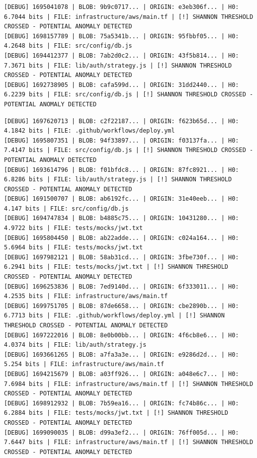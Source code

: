 \documentclass[12pt, a4paper, oneside]{report}
\begin{document}
\begin{lstlisting}[basicstyle=\tiny\ttfamily]
[DEBUG] 1695041078 | BLOB: 9b9c0717... | ORIGIN: e3eb306f... | H0: 6.7044 bits | FILE: infrastructure/aws/main.tf | [!] SHANNON THRESHOLD CROSSED - POTENTIAL ANOMALY DETECTED
[DEBUG] 1698157789 | BLOB: 75a5341b... | ORIGIN: 95fbbf05... | H0: 4.2648 bits | FILE: src/config/db.js
[DEBUG] 1694412377 | BLOB: 7ab2d0c2... | ORIGIN: 43f5b814... | H0: 7.3671 bits | FILE: lib/auth/strategy.js | [!] SHANNON THRESHOLD CROSSED - POTENTIAL ANOMALY DETECTED
[DEBUG] 1692738905 | BLOB: cafa599d... | ORIGIN: 31dd2440... | H0: 6.2239 bits | FILE: src/config/db.js | [!] SHANNON THRESHOLD CROSSED - POTENTIAL ANOMALY DETECTED
\end{lstlisting}
\begin{lstlisting}[basicstyle=\tiny\ttfamily]
[DEBUG] 1697620713 | BLOB: c2f22187... | ORIGIN: f623b65d... | H0: 4.1842 bits | FILE: .github/workflows/deploy.yml
[DEBUG] 1695807351 | BLOB: 94f33897... | ORIGIN: f03137fa... | H0: 7.4147 bits | FILE: src/config/db.js | [!] SHANNON THRESHOLD CROSSED - POTENTIAL ANOMALY DETECTED
[DEBUG] 1693614796 | BLOB: f01bfdc8... | ORIGIN: 87fc8921... | H0: 6.8286 bits | FILE: lib/auth/strategy.js | [!] SHANNON THRESHOLD CROSSED - POTENTIAL ANOMALY DETECTED
[DEBUG] 1691500707 | BLOB: ab6192fc... | ORIGIN: 31e40eeb... | H0: 4.147 bits | FILE: src/config/db.js
[DEBUG] 1694747834 | BLOB: b4885c75... | ORIGIN: 10431280... | H0: 4.9722 bits | FILE: tests/mocks/jwt.txt
[DEBUG] 1695804450 | BLOB: ab22adde... | ORIGIN: c024a164... | H0: 5.6964 bits | FILE: tests/mocks/jwt.txt
[DEBUG] 1697982121 | BLOB: 58ab31cd... | ORIGIN: 3fbe730f... | H0: 6.2941 bits | FILE: tests/mocks/jwt.txt | [!] SHANNON THRESHOLD CROSSED - POTENTIAL ANOMALY DETECTED
[DEBUG] 1696253836 | BLOB: 7ed9140d... | ORIGIN: 6f333011... | H0: 4.2535 bits | FILE: infrastructure/aws/main.tf
[DEBUG] 1699751705 | BLOB: 87de6658... | ORIGIN: cbe2890b... | H0: 6.7713 bits | FILE: .github/workflows/deploy.yml | [!] SHANNON THRESHOLD CROSSED - POTENTIAL ANOMALY DETECTED
[DEBUG] 1697222016 | BLOB: 8e0b00bb... | ORIGIN: 4f6cb8e6... | H0: 4.0374 bits | FILE: lib/auth/strategy.js
[DEBUG] 1693661265 | BLOB: a7fa3a3e... | ORIGIN: e9286d2d... | H0: 5.254 bits | FILE: infrastructure/aws/main.tf
[DEBUG] 1694215679 | BLOB: a03ff926... | ORIGIN: a048e6c7... | H0: 7.6984 bits | FILE: infrastructure/aws/main.tf | [!] SHANNON THRESHOLD CROSSED - POTENTIAL ANOMALY DETECTED
[DEBUG] 1698912932 | BLOB: 7b59ea16... | ORIGIN: fc74b86c... | H0: 6.2884 bits | FILE: tests/mocks/jwt.txt | [!] SHANNON THRESHOLD CROSSED - POTENTIAL ANOMALY DETECTED
[DEBUG] 1699090035 | BLOB: d99a3ef2... | ORIGIN: 76ff005d... | H0: 7.6447 bits | FILE: infrastructure/aws/main.tf | [!] SHANNON THRESHOLD CROSSED - POTENTIAL ANOMALY DETECTED

\end{lstlisting}
\end{document}
